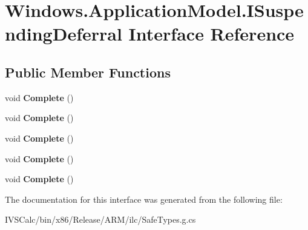 \hypertarget{interface_windows_1_1_application_model_1_1_i_suspending_deferral}{}\section{Windows.\+Application\+Model.\+I\+Suspending\+Deferral Interface Reference}
\label{interface_windows_1_1_application_model_1_1_i_suspending_deferral}
\subsection*{Public Member Functions}
\begin{DoxyCompactItemize}
\item 
\mbox{\label{interface_windows_1_1_application_model_1_1_i_suspending_deferral_a320ddc1a1b34b52b7cbbfc7fb15994ca}} 
void {\bfseries Complete} ()
\item 
\mbox{\label{interface_windows_1_1_application_model_1_1_i_suspending_deferral_a320ddc1a1b34b52b7cbbfc7fb15994ca}} 
void {\bfseries Complete} ()
\item 
\mbox{\label{interface_windows_1_1_application_model_1_1_i_suspending_deferral_a320ddc1a1b34b52b7cbbfc7fb15994ca}} 
void {\bfseries Complete} ()
\item 
\mbox{\label{interface_windows_1_1_application_model_1_1_i_suspending_deferral_a320ddc1a1b34b52b7cbbfc7fb15994ca}} 
void {\bfseries Complete} ()
\item 
\mbox{\label{interface_windows_1_1_application_model_1_1_i_suspending_deferral_a320ddc1a1b34b52b7cbbfc7fb15994ca}} 
void {\bfseries Complete} ()
\end{DoxyCompactItemize}


The documentation for this interface was generated from the following file\+:\begin{DoxyCompactItemize}
\item 
I\+V\+S\+Calc/bin/x86/\+Release/\+A\+R\+M/ilc/Safe\+Types.\+g.\+cs\end{DoxyCompactItemize}
